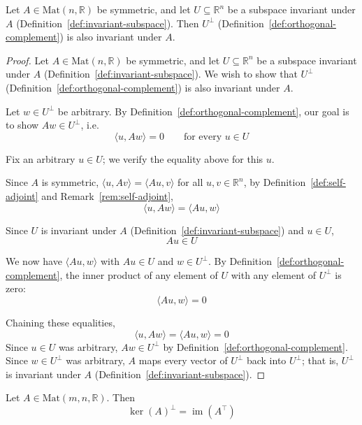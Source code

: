 		\begin{lemma}
			\label{lem:invariance-complement}
			Let $A \in \mathrm{Mat}(n,\mathbb{R})$ be symmetric, and let $U \subseteq \mathbb{R}^n$ be a subspace invariant under $A$ (Definition~\ref{def:invariant-subspace}). Then $U^\perp$ (Definition~\ref{def:orthogonal-complement}) is also invariant under $A$.
		\end{lemma}
		
		\begin{proof}
			Let $A \in \mathrm{Mat}(n,\mathbb{R})$ be symmetric, and let $U \subseteq \mathbb{R}^n$ be a subspace invariant under $A$ (Definition~\ref{def:invariant-subspace}). We wish to show that $U^\perp$ (Definition~\ref{def:orthogonal-complement}) is also invariant under $A$.
			
			Let $w \in U^\perp$ be arbitrary. By Definition~\ref{def:orthogonal-complement}, our goal is to show $Aw \in U^\perp$, i.e.\
			\[
				\langle u, Aw \rangle = 0 \qquad \text{for every } u \in U
			\]
			
			Fix an arbitrary $u \in U$; we verify the equality above for this $u$.
			
			Since $A$ is symmetric, $\langle u, Av \rangle = \langle Au, v \rangle$ for all $u,v \in \mathbb{R}^n$, by Definition~\ref{def:self-adjoint} and Remark~\ref{rem:self-adjoint},
			\[
				\langle u, Aw \rangle = \langle Au, w \rangle
			\]
			
			Since $U$ is invariant under $A$ (Definition~\ref{def:invariant-subspace}) and $u \in U$,
			\[
				Au \in U
			\]
			
			We now have $\langle Au, w\rangle$ with $Au \in U$ and $w \in U^\perp$. By Definition~\ref{def:orthogonal-complement}, the inner product of any element of $U$ with any element of $U^\perp$ is zero:
			\[
				\langle Au, w \rangle = 0
			\]
			
			Chaining these equalities,
			\[
				\langle u, Aw \rangle = \langle Au, w \rangle = 0
			\]
			Since $u \in U$ was arbitrary, $Aw \in U^\perp$ by Definition~\ref{def:orthogonal-complement}. Since $w \in U^\perp$ was arbitrary, $A$ maps every vector of $U^\perp$ back into $U^\perp$; that is, $U^\perp$ is invariant under $A$ (Definition~\ref{def:invariant-subspace}).
		\end{proof}
		
		\begin{corollary}
			\label{cor:kernel-image-orthogonal-complement}
			Let $A\in\mathrm{Mat}(m,n,\mathbb{R})$. Then
			\[
				\ker(A)^\perp = \operatorname{im}(A^\top)
			\]
		\end{corollary}
		
